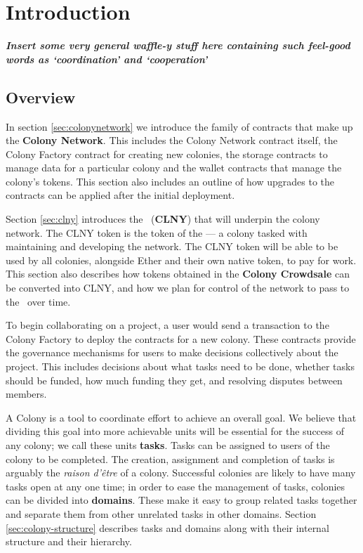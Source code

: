 \section{Introduction}


\textbf{\emph{Insert some very general waffle-y stuff here containing such feel-good words as `coordination' and `cooperation'}}

\subsection{Overview}

In section \ref{sec:colonynetwork} we introduce the family of contracts that make up the \textbf{Colony Network}. This includes the Colony Network contract itself, the Colony Factory contract for creating new colonies, the storage contracts to manage data for a particular colony and the wallet contracts that manage the colony's tokens. This section also includes an outline of how upgrades to the contracts can be applied after the initial deployment.

Section \ref{sec:clny} introduces the \rcts\ (\textbf{CLNY}) that will underpin the colony network. The CLNY token is the token of the \textbf{\rc} --- a colony tasked with maintaining and developing the network. The CLNY token will be able to be used by all colonies, alongside Ether and their own native token, to pay for work. This section also describes how tokens obtained in the \textbf{Colony Crowdsale} can be converted into CLNY, and how we plan for control of the network to pass to the \rc\ over time.

To begin collaborating on a project, a user would send a transaction to the Colony Factory to deploy the contracts for a new colony. These contracts provide the governance mechanisms for users to make decisions collectively about the project. This includes decisions about what tasks need to be done, whether tasks should be funded, how much funding they get, and resolving disputes between members.

A Colony is a tool to coordinate effort to achieve an overall goal. We believe that dividing this goal into more achievable units will be essential for the success of any colony; we call these units \textbf{tasks}. Tasks can be assigned to users of the colony to be completed. The creation, assignment and completion of tasks is arguably the \emph{raison d'être} of a colony. Successful colonies are likely to have many tasks open at any one time; in order to ease the management of tasks, colonies can be divided into \textbf{domains}. These make it easy to group related tasks together and separate them from other unrelated tasks in other domains. Section \ref{sec:colony-structure} describes tasks and domains along with their internal structure and their hierarchy.

